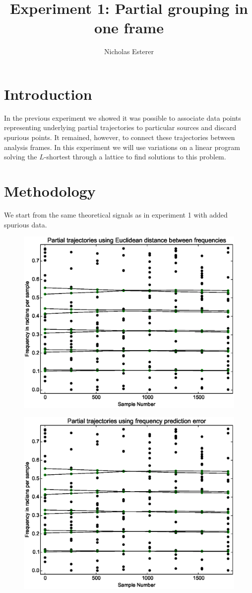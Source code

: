 \documentclass[letterpaper,12pt]{report}
\begin{document}
\author{Nicholas Esterer}
\title{Experiment 1: Partial grouping in one frame}
\maketitle
\tableofcontents
\section{Introduction}
In the previous experiment we showed it was possible to associate data points
representing underlying partial trajectories to particular sources and discard
spurious points. It remained, however, to connect these trajectories between
analysis frames. In this experiment we will use variations on a linear program
solving the $L$-shortest through a lattice to find solutions to this problem.
\section{Methodology}
We start from the same theoretical signals as in experiment 1 with added
spurious data.
\begin{figure}
    \centering
    \includegraphics[width=\textwidth]{../experiment_2/plots/lp_ptrack_eudist.eps}
\end{figure}
\begin{figure}
    \centering
    \includegraphics[width=\textwidth]{../experiment_2/plots/lp_ptrack_fpredict.eps}
\end{figure}
%
\end{document}
